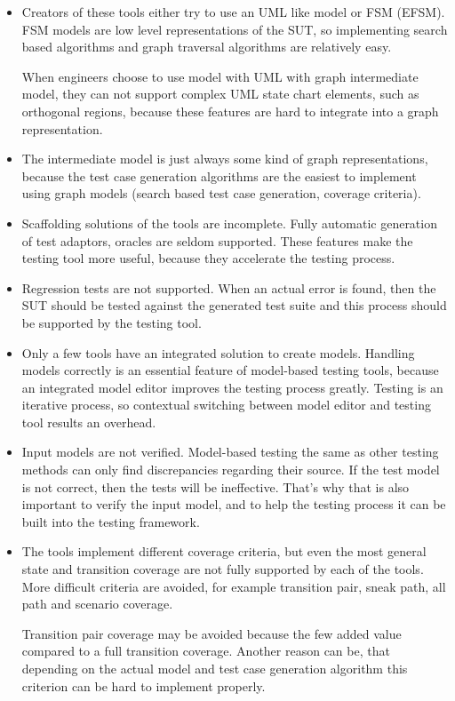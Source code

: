 \begin{itemize}
	\item Creators of these tools either try to use an UML like model or FSM (EFSM). FSM models are low level representations of the SUT, so implementing search based algorithms and graph traversal algorithms are relatively easy.
	
	When engineers choose to use model with UML with graph intermediate model, they can not support complex UML state chart elements, such as orthogonal regions, because these features are hard to integrate into a graph representation.
	\item The intermediate model is just always some kind of graph representations, because the test case generation algorithms are the easiest to implement using graph models (search based test case generation, coverage criteria).
	\item Scaffolding solutions of the tools are incomplete. Fully automatic generation of test adaptors, oracles are seldom supported. These features make the testing tool more useful, because they accelerate the testing process.
	\item Regression tests are not supported. When an actual error is found, then the SUT should be tested against the generated test suite and this process should be supported by the testing tool.
	\item Only a few tools have an integrated solution to create models. Handling models correctly is an essential feature of model-based testing tools, because an integrated model editor improves the testing process greatly. Testing is an iterative process, so contextual switching between model editor and testing tool results an overhead.
	\item Input models are not verified. Model-based testing the same as other testing methods can only find discrepancies regarding their source. If the test model is not correct, then the tests will be ineffective. That's why that is also important to verify the input model, and to help the testing process it can be built into the testing framework.
	\item The tools implement different coverage criteria, but even the most general state and transition coverage are not fully supported by each of the tools. More difficult criteria are avoided, for example transition pair, sneak path, all path and scenario coverage.
	
	Transition pair coverage may be avoided because the few added value compared to a full transition coverage. Another reason can be, that depending on the actual model and test case generation algorithm this criterion can be hard to implement properly.
	

\end{itemize}
